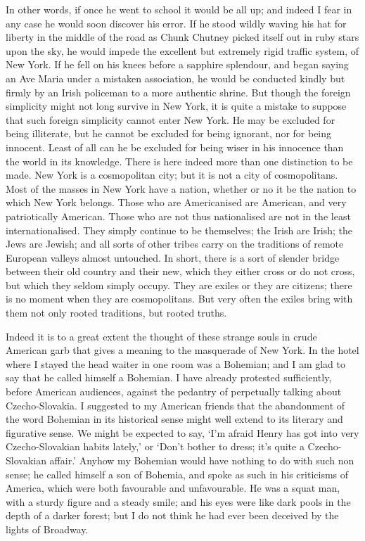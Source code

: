 \documentclass{book}
\begin{document}
In other words, if once he went to school it would be all up; and indeed I fear in any case he would soon discover his error. If he stood wildly waving his hat for liberty in the middle of the road as Chunk Chutney picked itself out in ruby stars upon the sky, he would impede the excellent but extremely rigid traffic system, of New York. If he fell on his knees before a sapphire splendour, and began saying an Ave Maria under a mistaken association, he would be conducted kindly but firmly by an Irish policeman to a more authentic shrine. But though the foreign simplicity might not long survive in New York, it is quite a mistake to suppose that such foreign simplicity cannot enter New York. He may be excluded for being illiterate, but he cannot be excluded for being ignorant, nor for being innocent. Least of all can he be excluded for being wiser in his innocence than the world in its knowledge. There is here indeed more than one distinction to be made. New York is a cosmopolitan city; but it is not a city of cosmopolitans. Most of the masses in New York have a nation, whether or no it be the nation to which New York belongs. Those who are Americanised are American, and very patriotically American. Those who are not thus nationalised are not in the least internationalised. They simply continue to be themselves; the Irish are Irish; the Jews are Jewish; and all sorts of other tribes carry on the traditions of remote European valleys almost untouched. In short, there is a sort of slender bridge between their old country and their new, which they either cross or do not cross, but which they seldom simply occupy. They are exiles or they are citizens; there is no moment when they are cosmopolitans. But very often the exiles bring with them not only rooted traditions, but rooted truths.

Indeed it is to a great extent the thought of these strange souls in crude American garb that gives a meaning to the masquerade of New York. In the hotel where I stayed the head waiter in one room was a Bohemian; and I am glad to say that he called himself a Bohemian. I have already protested sufficiently, before American audiences, against the pedantry of perpetually talking about Czecho-Slovakia. I suggested to my American friends that the abandonment of the word Bohemian in its historical sense might well extend to its literary and figurative sense. We might be expected to say, ‘I’m afraid Henry has got into very Czecho-Slovakian habits lately,’ or ‘Don’t bother to dress; it’s quite a Czecho-Slovakian affair.’ Anyhow my Bohemian would have nothing to do with such non sense; he called himself a son of Bohemia, and spoke as such in his criticisms of America, which were both favourable and unfavourable. He was a squat man, with a sturdy figure and a steady smile; and his eyes were like dark pools in the depth of a darker forest; but I do not think he had ever been deceived by the lights of Broadway.
\end{document}
